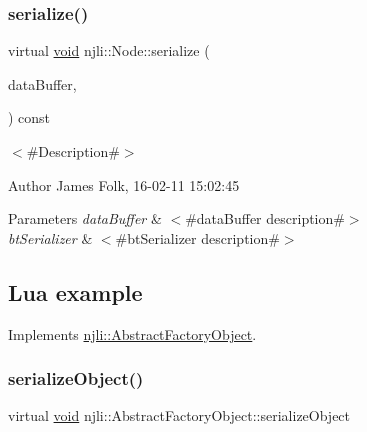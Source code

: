 \subsubsection{\texorpdfstring{serialize()}{serialize()}}
{\footnotesize\ttfamily virtual \mbox{\hyperlink{_thread_8h_af1e856da2e658414cb2456cb6f7ebc66}{void}} njli\+::\+Node\+::serialize (\begin{DoxyParamCaption}\item[{\mbox{\hyperlink{_thread_8h_af1e856da2e658414cb2456cb6f7ebc66}{void}} $\ast$}]{data\+Buffer,  }\item[{bt\+Serializer $\ast$}]{ }\end{DoxyParamCaption}) const\hspace{0.3cm}{\ttfamily [virtual]}}



$<$\#\+Description\#$>$ 

\begin{DoxyAuthor}{Author}
James Folk, 16-\/02-\/11 15\+:02\+:45
\end{DoxyAuthor}

\begin{DoxyParams}{Parameters}
{\em data\+Buffer} & $<$\#data\+Buffer description\#$>$ \\
\hline
{\em bt\+Serializer} & $<$\#bt\+Serializer description\#$>$\\
\hline
\end{DoxyParams}
\hypertarget{classnjli_1_1_steering_behavior_wander_ex1}{}\subsection{Lua example}\label{classnjli_1_1_steering_behavior_wander_ex1}

\begin{DoxyCodeInclude}
\end{DoxyCodeInclude}


Implements \mbox{\hyperlink{classnjli_1_1_abstract_factory_object_aad2fbe86fb3bdecf02918a96b9c57976}{njli\+::\+Abstract\+Factory\+Object}}.

\mbox{\label{classnjli_1_1_node_a4fc4bcd9d1930911474210c047372fc0}} 
\subsubsection{\texorpdfstring{serialize\+Object()}{serializeObject()}}
{\footnotesize\ttfamily virtual \mbox{\hyperlink{_thread_8h_af1e856da2e658414cb2456cb6f7ebc66}{void}} njli\+::\+Abstract\+Factory\+Object\+::serialize\+Object}

